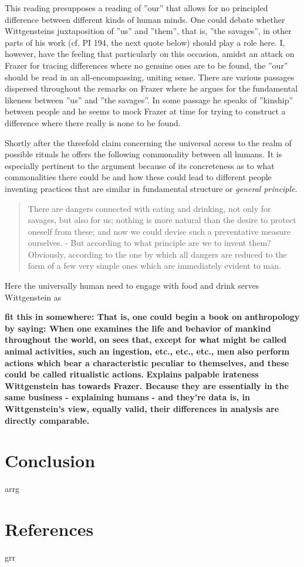 \documentclass{article}
\begin{document}
This reading presupposes a reading of ''our'' that allows for no principled difference between different kinds of human minds. One could debate whether Wittgensteins juxtaposition of ''us'' and ''them'', that is, ''the savages'', in other parts of his work (cf. PI 194, the next quote below) should play a role here. I, however, have the feeling that particularly on this occasion, amidst an attack on Frazer for tracing differences where no genuine ones are to be found, the ''our'' should be read in an all-encompassing, uniting sense. There are various passages dispersed throughout the remarks on Frazer where he argues for the fundamental likeness between ''us'' and ''the savages''. In some passage he speaks of ''kinship'' between people and he seems to mock Frazer at time for trying to construct a difference where there really is none to be found. 

Shortly after the threefold claim concerning the universal access to the realm of possible rituals he offers the following commonality between all humans. It is especially pertinent to the argument because of its concreteness as to what commonalities there could be and how these could lead to different people inventing practices that are similar in fundamental structure or \textit{general principle}.
\begin{quote}
There are dangers connected with eating and drinking, not only for savages, but also for us; nothing is more natural than the desire to protect oneself from these; and now we could devise such a preventative measure ourselves. - But according to what principle are we to invent them? Obviously, according to the one by which all dangers are reduced to the form of a few very simple ones which are immediately evident to man.
\end{quote}
Here the universally human need to engage with food and drink serves Wittgenstein as

\textbf{ 
fit this in somewhere: That is, one could begin a book on anthropology by saying: When one examines the life and behavior of mankind throughout the world, on sees that, except for what might be called animal activities, such an ingestion, etc., etc., etc., men also perform actions which bear a characteristic peculiar to themselves, and these could be called ritualistic actions.}
\textbf{Explains palpable irateness Wittgenstein has towards Frazer. Because they are essentially in the same business - explaining humans - and they're data is, in Wittgenstein's view, equally valid, their differences in analysis are directly comparable.}

\section{Conclusion}
\hypertarget{sec4}{arrg}
\section{References}
\hypertarget{sec5}{grr}
\end{document}
